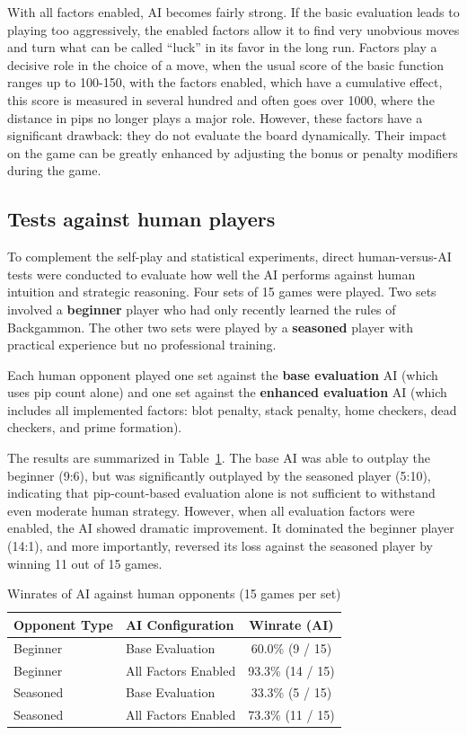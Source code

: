 With all factors enabled, AI becomes fairly strong. If the basic evaluation leads to playing too aggressively, the enabled factors allow it to find very unobvious moves and turn what can be called “luck” in its favor in the long run. Factors play a decisive role in the choice of a move, when the usual score of the basic function ranges up to 100-150, with the factors enabled, which have a cumulative effect, this score is measured in several hundred and often goes over 1000, where the distance in pips no longer plays a major role.
However, these factors have a significant drawback: they do not evaluate the board dynamically. Their impact on the game can be greatly enhanced by adjusting the bonus or penalty modifiers during the game.

\subsection{Tests against human players}

To complement the self-play and statistical experiments, direct human-versus-AI tests were conducted to evaluate how well the AI performs against human intuition and strategic reasoning. Four sets of 15 games were played. Two sets involved a \textbf{beginner} player who had only recently learned the rules of Backgammon. The other two sets were played by a \textbf{seasoned} player with practical experience but no professional training.

Each human opponent played one set against the \textbf{base evaluation} AI (which uses pip count alone) and one set against the \textbf{enhanced evaluation} AI (which includes all implemented factors: blot penalty, stack penalty, home checkers, dead checkers, and prime formation).

The results are summarized in Table~\ref{tab:human_winrate}. The base AI was able to outplay the beginner (9:6), but was significantly outplayed by the seasoned player (5:10), indicating that pip-count-based evaluation alone is not sufficient to withstand even moderate human strategy. However, when all evaluation factors were enabled, the AI showed dramatic improvement. It dominated the beginner player (14:1), and more importantly, reversed its loss against the seasoned player by winning 11 out of 15 games.
\begin{table}[h!]
\centering
\caption{Winrates of AI against human opponents (15 games per set)}
\label{tab:human_winrate}
\begin{tabular}{|l|l|c|}
\hline
\textbf{Opponent Type} & \textbf{AI Configuration} & \textbf{Winrate (AI)} \\
\hline
Beginner& Base Evaluation & 60.0\% (9 / 15)\\
\hline
Beginner& All Factors Enabled & 93.3\% (14 / 15)\\
\hline
Seasoned & Base Evaluation  & 33.3\% (5 / 15)\\
\hline
Seasoned  & All Factors Enabled  & 73.3\% (11 / 15)\\
\hline
\end{tabular}
\end{table}

